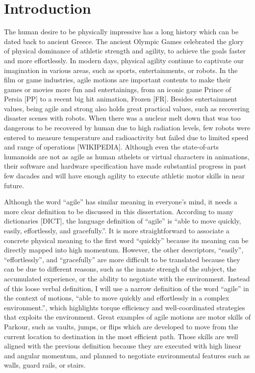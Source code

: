 \chapter{Introduction}

The human desire to be physically impressive has a long history which can be
dated back to ancient Greece.
The ancient Olympic Games celebrated the glory of physical dominance of
athletic strength and agility, to achieve the goals faster and more
effortlessly. 
In modern days, physical agility continue to captivate our imagination in
various areas, such as sports, entertainments, or robots.
In the film or game industries, agile motions are important contents to make
their games or movies more fun and entertainings, from an iconic game
Prince of Persia [PP] to a recent big hit animation, Frozen [FR].
Besides entertainment values, being agile and strong also holds great practical
values, such as recovering disaster scenes with robots.
When there was a nuclear melt down that was too dangerous to be recovered
by human due to high radiation levels, few robots were entered to measure
temperature and radioactivity but failed due to limited speed and range of
operations [WIKIPEDIA].
Although even the state-of-arts humanoids are not as agile as human athelets
or virtual characters in animations, their software and hardware specification
have made substantial progress in past few dacades and will have enough agility
to execute athletic motor skills in near future.

Although the word ``agile'' has similar meaning in everyone's mind,
it needs a more clear definition to be discussed in this dissertation.
According to many dictionaries [DICT], the language definition of ``agile''
is ``able to move quickly, easily, effortlessly, and gracefully.''.
It is more straightforward to associate a concrete physical meaning to the
first word ``quickly'' because its meaning can be directly mapped into
high momentum.
However, the other descriptors, ``easily'', ``effortlessly'', and
``gracefully'' are more difficult to be translated because they can be due to
different reasons, such as the innate strengh of the subject, the accumulated
experience, or the ability to negotiate with the environment.
Instead of this loose verbal definition, I will use a narrow definition of the
word ``agile'' in the context of motions, ``able to move quickly and
effortlessly in a complex environment.'', which highlights torque efficiency
and well-coordinated strategies that exploits the environment.
Great examples of agile motions are motor skills of Parkour, such as
vaults, jumps, or flips which are developed to move from the current location
to destination in the most efficient path.
Those skills are well aligned with the previous definition because they are
executed with high linear and angular momentum, and planned to negotiate
environmental features such as walls, guard rails, or stairs. 

